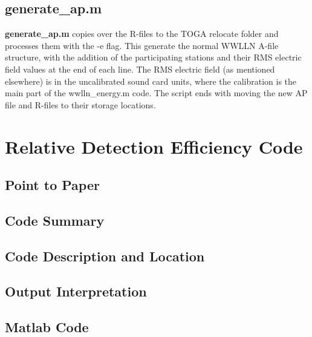 \subsection{generate\_ap.m}

{\bf generate\_ap.m} copies over the R-files to the TOGA relocate folder and processes them with the -e flag.
This generate the normal WWLLN A-file structure, with the addition of the participating stations and their RMS electric field values at the end of each line.
The RMS electric field (as mentioned elsewhere) is in the uncalibrated sound card units, where the calibration is the main part of the wwlln\_energy.m code.
The script ends with moving the new AP file and R-files to their storage locations.
\section{Relative Detection Efficiency Code}

\subsection{Point to Paper}

\subsection{Code Summary}

\subsection{Code Description and Location}

\subsection{Output Interpretation}

\subsection{Matlab Code}